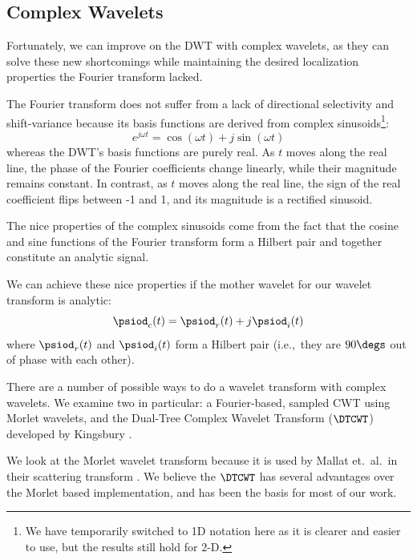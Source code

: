 \subsection{Complex Wavelets}\label{sec:ch2:complex_wavelets}
  Fortunately, we can improve on the DWT with complex wavelets, as they can
  solve these new shortcomings while maintaining the desired localization
  properties the Fourier transform lacked.

  The Fourier transform does not suffer from a lack of directional selectivity
  and shift-variance because its basis functions are derived from complex
  sinusoids\footnote{We have temporarily switched to 1D
  notation here as it is clearer and easier to use, but the results still hold
  for 2-D.}:
  \begin{equation}
    e^{j\omega t} = \cos(\omega t) + j\sin(\omega t)
  \end{equation}
  whereas the DWT's basis functions are purely real. As $t$ moves along the real line, the phase of the
  Fourier coefficients change linearly, while their magnitude remains constant. In
  contrast, as $t$ moves along the real line, the sign of the real coefficient
  flips between -1 and 1, and its magnitude is a rectified sinusoid.

  The nice properties of the complex sinusoids come from the fact that the
  cosine and sine functions of the Fourier transform form a Hilbert pair and
  together constitute an analytic signal.

  We can achieve these nice properties if the mother wavelet for our wavelet
  transform is analytic:
  \begin{equation}
    \psiod_{c}(t) = \psiod_{r}(t) + j\psiod_{i}(t) \label{eq:ch2:complex_wavelet}
  \end{equation}
  where $\psiod_{r}(t)$ and $\psiod_{i}(t)$ form a Hilbert pair (i.e.,\ they are
  $90\degs$ out of phase with each other).

  There are a number of possible ways to do a wavelet transform with complex
  wavelets. We examine two in particular: a Fourier-based, sampled CWT using
  Morlet wavelets, and the Dual-Tree Complex Wavelet Transform ($\DTCWT$)
  developed by Kingsbury \cite{kingsbury_wavelet_1998, kingsbury_dual-tree_1998,
  kingsbury_dual-tree_1998-1,  kingsbury_image_1999, kingsbury_shift_1999,
  kingsbury_dual-tree_2000, kingsbury_complex_2001, selesnick_dual-tree_2005}.

  We look at the Morlet wavelet transform because it is used by
  Mallat et.\ al.\ in their scattering transform
  \cite{bruna_classification_2011, bruna_invariant_2013, bruna_scattering_2013,
  oyallon_generic_2013, oyallon_deep_2015, sifre_rotation_2013,
  sifre_rigid-motion_2014, sifre_rigid-motion_2014-1, sifre_scatnet_2013}.
  We believe the $\DTCWT$ has
  several advantages over the Morlet based implementation, and has been the
  basis for most of our work.

